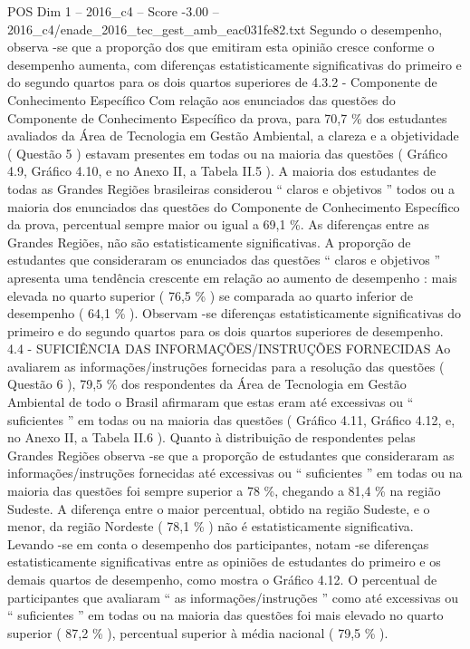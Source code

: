 \begin{textsample}{POS Dim 1 – 2016\_c4 – Score -3.00 – 2016\_c4/enade\_2016\_tec\_gest\_amb\_eac031fe82.txt}
Segundo o desempenho, observa -se que a proporção dos que emitiram esta opinião cresce conforme o desempenho aumenta, com diferenças estatisticamente significativas do primeiro e do segundo quartos para os dois quartos superiores de 4.3.2 - Componente de Conhecimento Específico Com relação aos enunciados das questões do Componente de Conhecimento Específico da prova, para 70,7 \% dos estudantes avaliados da Área de Tecnologia em Gestão Ambiental, a clareza e a objetividade ( Questão 5 ) estavam presentes em todas ou na maioria das questões ( Gráfico 4.9, Gráfico 4.10, e no Anexo II, a Tabela II.5 ).
A maioria dos estudantes de todas as Grandes Regiões brasileiras considerou “ claros e objetivos ” todos ou a maioria dos enunciados das questões do Componente de Conhecimento Específico da prova, percentual sempre maior ou igual a 69,1 \%.
As diferenças entre as Grandes Regiões, não são estatisticamente significativas.
A proporção de estudantes que consideraram os enunciados das questões “ claros e objetivos ” apresenta uma tendência crescente em relação ao aumento de desempenho : mais elevada no quarto superior ( 76,5 \% ) se comparada ao quarto inferior de desempenho ( 64,1 \% ).
Observam -se diferenças estatisticamente significativas do primeiro e do segundo quartos para os dois quartos superiores de desempenho. 4.4 - SUFICIÊNCIA DAS INFORMAÇÕES/INSTRUÇÕES FORNECIDAS Ao avaliarem as informações/instruções fornecidas para a resolução das questões ( Questão 6 ), 79,5 \% dos respondentes da Área de Tecnologia em Gestão Ambiental de todo o Brasil afirmaram que estas eram até excessivas ou “ suficientes ” em todas ou na maioria das questões ( Gráfico 4.11, Gráfico 4.12, e, no Anexo II, a Tabela II.6 ).
Quanto à distribuição de respondentes pelas Grandes Regiões observa -se que a proporção de estudantes que consideraram as informações/instruções fornecidas até excessivas ou “ suficientes ” em todas ou na maioria das questões foi sempre superior a 78 \%, chegando a 81,4 \% na região Sudeste.
A diferença entre o maior percentual, obtido na região Sudeste, e o menor, da região Nordeste ( 78,1 \% ) não é estatisticamente significativa.
Levando -se em conta o desempenho dos participantes, notam -se diferenças estatisticamente significativas entre as opiniões de estudantes do primeiro e os demais quartos de desempenho, como mostra o Gráfico 4.12.
O percentual de participantes que avaliaram “ as informações/instruções ” como até excessivas ou “ suficientes ” em todas ou na maioria das questões foi mais elevado no quarto superior ( 87,2 \% ), percentual superior à média nacional ( 79,5 \% ).

\end{textsample}
